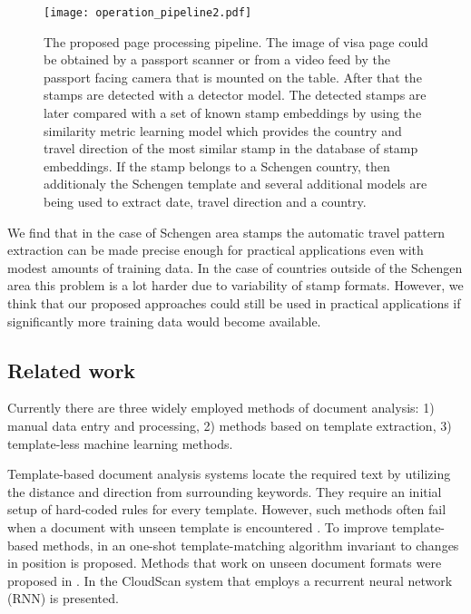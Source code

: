 \documentclass[twocolumn]{svjour3}
\begin{document}
\begin{figure*}
    \centering
    \texttt{[image: operation\_pipeline2.pdf]}
    \caption{The proposed page processing pipeline.
    The image of visa page could be obtained by a passport scanner or from a video feed by the passport facing camera that is mounted on the table.
    After that the stamps are detected with a detector model.
    The detected stamps are later compared with a set of known stamp embeddings by using the similarity metric learning model which provides the country and travel direction of the most similar stamp in the database of stamp embeddings.
    If the stamp belongs to a Schengen country, then additionaly the Schengen template and several additional models are being used to extract date, travel direction and a country.
    }
    \label{fig:pipeline}
\end{figure*}

We find that in the case of Schengen area stamps the automatic travel pattern extraction can be made precise enough for practical applications even with modest amounts of training data. In the case of countries outside of the Schengen area this problem is a lot harder due to variability of stamp formats. However, we think that our proposed approaches could still be used in practical applications if significantly more training data would become available.


\subsection{Related work}
\label{related}

Currently there are three widely employed methods of document analysis: 1) manual data entry and processing, 2) methods based on template extraction, 3) template-less machine learning methods.

Template-based document analysis systems \cite{Cesarini1998,Rusinol2013,Schuster2013,dAndecy2018} locate the required text by utilizing the distance and direction from surrounding keywords. They require an initial setup of hard-coded rules for every template. However, such methods often fail when a document with unseen template is encountered \cite{Rusinol2013}. To improve template-based methods, in \cite{Dhakal2019} an one-shot template-matching algorithm invariant to changes in position is proposed. Methods that work on unseen document formats were proposed in \cite{Palm2017,Holt2018}. In \cite{Palm2017} the CloudScan system that employs a recurrent neural network (RNN) is presented.
\end{document}
